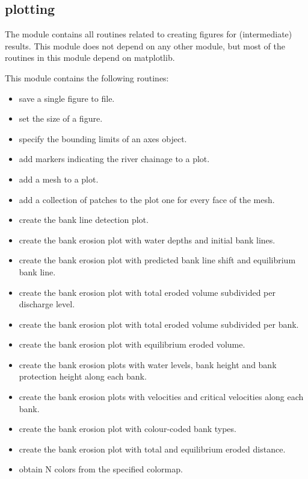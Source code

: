 \subsection{plotting }

The  module contains all routines related to creating figures for \dfastbe (intermediate) results.
This module does not depend on any other \dfastbe module, but most of the routines in this module depend on matplotlib.

This module contains the following routines:

\begin{itemize}
\item {} save a single figure to file.
\item {} set the size of a figure.
\item {} specify the bounding limits of an axes object.
\item {} add markers indicating the river chainage to a plot.
\item {} add a mesh to a plot.
\item {} add a collection of patches to the plot one for every face of the mesh.

\item {} create the bank line detection plot.

\item {} create the bank erosion plot with water depths and initial bank lines.
\item {} create the bank erosion plot with predicted bank line shift and equilibrium bank line.
\item {} create the bank erosion plot with total eroded volume subdivided per discharge level.
\item {} create the bank erosion plot with total eroded volume subdivided per bank.
\item {} create the bank erosion plot with equilibrium eroded volume.
\item {} create the bank erosion plots with water levels, bank height and bank protection height along each bank.
\item {} create the bank erosion plots with velocities and critical velocities along each bank.
\item {} create the bank erosion plot with colour-coded bank types.
\item {} create the bank erosion plot with total and equilibrium eroded distance.
\item {} obtain N colors from the specified colormap.
\end{itemize}
